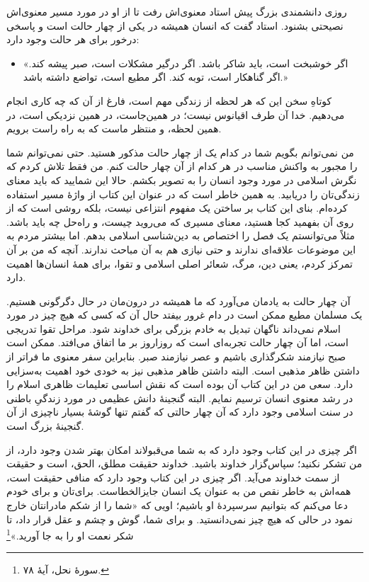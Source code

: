 روزی دانشمندی بزرگ پیش استاد معنوی‌اش رفت تا از او در مورد مسیر معنوی‌اش نصیحتی بشنود. استاد گفت که انسان همیشه در یکی از چهار حالت است و پاسخی درخور برای هر حالت وجود دارد:

\begin{itemize}
	\item[]
	«اگر خوشبخت است، باید شاکر باشد. اگر درگیر مشکلات است، صبر پیشه کند. اگر گناهکار است، توبه کند. اگر مطیع است، تواضع داشته باشد.»
\end{itemize}



کوتاهِ سخن این که هر لحظه‌ از زندگی مهم است، فارغ از آن که چه کاری انجام می‌دهیم. خدا آن طرف اقیانوس نیست؛ در همین‌جاست، در همین نزدیکی است، در همین لحظه، و منتظر ماست که به راه راست برویم.

من نمی‌توانم بگویم شما در کدام یک از چهار حالت مذکور هستید. حتی نمی‌توانم شما را مجبور به واکنش مناسب در هر کدام از آن چهار حالت کنم.  من فقط تلاش کردم که نگرش اسلامی در مورد وجود انسان را به تصویر بکشم. حالا این شمایید که باید معنای زندگی‌تان را دریابید. به همین خاطر است که  در عنوان این کتاب از واژهٔ مسیر استفاده کرده‌ام. بنای این کتاب بر ساختن یک مفهوم انتزاعی نیست، بلکه روشی است که از روی آن بفهمید کجا هستید، معنای مسیری که می‌روید چیست، و راه‌حل چه باید باشد. مثلاً می‌توانستم یک فصل را اختصاص به دین‌شناسی اسلامی بدهم. اما بیشتر مردم به این موضوعات علاقه‌ای ندارند و حتی نیازی هم به آن مباحث ندارند. آنچه که من بر آن تمرکز کردم، یعنی دین، مرگ، شعائر اصلی اسلامی و تقوا، برای همهٔ انسان‌ها اهمیت دارد.

آن چهار حالت به یادمان می‌آورد که ما همیشه در درون‌مان در حال دگرگونی هستیم. یک مسلمان مطیع ممکن است در دام غرور بیفتد حال آن که کسی که هیچ چیز در مورد اسلام نمی‌داند ناگهان تبدیل به خادم بزرگی برای خداوند شود. مراحل تقوا تدریجی است، اما آن چهار حالت تجربه‌ای است که روزاروز بر ما اتفاق می‌افتد. ممکن است صبح نیازمند شکرگذاری باشیم و عصر نیازمند صبر. بنابراین سفر معنوی ما فراتر از داشتن ظاهر مذهبی  است. البته داشتن ظاهر مذهبی نیز به خودی خود اهمیت به‌سزایی دارد. سعی من در این کتاب آن بوده است که نقش اساسی تعلیمات ظاهری اسلام را در رشد معنوی انسان ترسیم نمایم. البته گنجینهٔ دانش عظیمی در مورد زندگیِ باطنی در سنت اسلامی وجود دارد که آن چهار حالتی که گفتم تنها گوشهٔ بسیار ناچیزی از آن گنجینهٔ بزرگ است.

اگر چیزی در این کتاب وجود دارد که به شما می‌قبولاند امکان بهتر شدن وجود دارد، از من تشکر نکنید؛ سپاس‌گزار خداوند باشید. خداوند حقیقت مطلق، الحق، است و حقیقت از سمت خداوند می‌آید. اگر چیزی در این کتاب وجود دارد که منافی حقیقت است، همه‌اش به خاطر نقص من به عنوان یک انسان جایزالخطاست. برای‌تان و برای خودم دعا می‌کنم که بتوانیم سرسپردهٔ او باشیم؛ اویی که  «شما را از شکم مادرانتان خارج نمود در حالی که هیچ چیز نمی‌دانستید. و برای شما، گوش و چشم و عقل قرار داد، تا شکر نعمت او را به جا آورید.»\footnote{سورهٔ نحل، آیهٔ ۷۸.}

